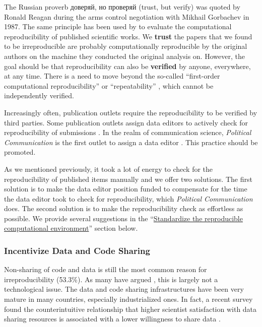 The Russian proverb доверяй, но проверяй (trust, but verify) was quoted by Ronald Reagan during the arms control negotiation with Mikhail Gorbachev in 1987. The same principle has been used by \textcite{willis:2020:TV} to evaluate the computational reproducibility of published scientific works. We \textbf{trust} the papers that we found to be irreproducible are probably computationally reproducible by the original authors on the machine they conducted the original analysis on. However, the goal should be that reproducibility can also be \textbf{verified} by anyone, everywhere, at any time. There is a need to move beyond the so-called ``first-order computational reproducibility'' \parencite{schoch:2023:CRC} or ``repeatability'' \parencite{mcarthur:2019:RRR}, which cannot be independently verified.

Increasingly often, publication outlets require the reproducibility to be verified by third parties. Some publication outlets assign data editors to actively check for reproducibility of submissions \parencite[]{vilhuber2023reproducibility}. In the realm of communication science, \textit{Political Communication} is the first outlet to assign a data editor \parencite[]{lawrence:2022:EN}. This practice should be promoted.

As we mentioned previously, it took a lot of energy to check for the reproducibility of published items manually and we offer two solutions. The first solution is to make the data editor position funded to compensate for the time the data editor took to check for reproducibility, which \textit{Political Communication} does. The second solution is to make the reproducibility check as effortless as possible. We provide several suggestions in the ``\hyperref[subsubsec:compenviron]{Standardize the reproducible computational environment}'' section below.

\subsubsection{Incentivize Data and Code Sharing}

Non-sharing of code and data is still the most common reason for irreproducibility (53.3\%). As many have argued \parencite[e.g.][]{rowhani-farid:2017:W, panhuis:2014}, this is largely not a technological issue. The data and code sharing infrastructures have been very mature in many countries, especially industrialized ones. In fact, a recent survey found the counterintuitive relationship that higher scientist satisfaction with data sharing resources is associated with a lower willingness to share data \parencite[]{borycz:2023:P}.

